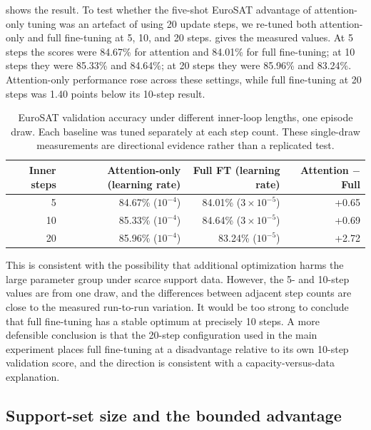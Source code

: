 \documentclass[11pt]{article}
\begin{document}
\label{sec:steps}

 shows the result. To test whether the five-shot EuroSAT advantage of attention-only tuning was an artefact of using 20 update steps, we re-tuned both attention-only and full fine-tuning at 5, 10, and 20 steps.  gives the measured values. At 5 steps the scores were 84.67\% for attention and 84.01\% for full fine-tuning; at 10 steps they were 85.33\% and 84.64\%; at 20 steps they were 85.96\% and 83.24\%. Attention-only performance rose across these settings, while full fine-tuning at 20 steps was 1.40 points below its 10-step result.

\begin{table}[t]
\centering
\small
\caption{EuroSAT validation accuracy under different inner-loop lengths, one episode draw. Each baseline was tuned separately at each step count. These single-draw measurements are directional evidence rather than a replicated test.}
\label{tab:steps}
\begin{tabular}{rrrr}
\toprule
Inner steps & Attention-only (learning rate) & Full FT (learning rate) & Attention $-$ Full\\
\midrule
5 & 84.67\% ($10^{-4}$) & 84.01\% ($3\times10^{-5}$) & +0.65\\
10 & 85.33\% ($10^{-4}$) & 84.64\% ($3\times10^{-5}$) & +0.69\\
20 & 85.96\% ($10^{-4}$) & 83.24\% ($10^{-5}$) & +2.72\\
\bottomrule
\end{tabular}
\end{table}

This is consistent with the possibility that additional optimization harms the large parameter group under scarce support data. However, the 5- and 10-step values are from one draw, and the differences between adjacent step counts are close to the measured run-to-run variation. It would be too strong to conclude that full fine-tuning has a stable optimum at precisely 10 steps. A more defensible conclusion is that the 20-step configuration used in the main experiment places full fine-tuning at a disadvantage relative to its own 10-step validation score, and the direction is consistent with a capacity-versus-data explanation.

\subsection{Support-set size and the bounded advantage}
\end{document}

